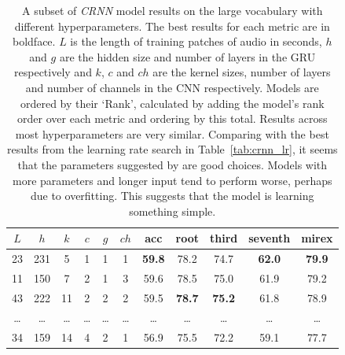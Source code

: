 \begin{table}[h]
    \centering
    \begin{tabular}{ccccccccccc}
        \toprule
        $L$ & $h$ & $k$ & $c$ & $g$ & $ch$ & acc & root & third & seventh & mirex \\
        \midrule
        23 & 231 & 5 & 1 & 1 & 1 & \textbf{59.8} & 78.2 & 74.7 & \textbf{62.0} & \textbf{79.9} \\
        11 & 150 & 7 & 2 & 1 & 3 & 59.6 & 78.5 & 75.0 & 61.9 & 79.2 \\
        43 & 222 & 11 & 2 & 2 & 2 & 59.5 & \textbf{78.7} & \textbf{75.2} & 61.8 & 78.9 \\
        \ldots & \ldots & \ldots & \ldots & \ldots & \ldots & \ldots & \ldots & \ldots & \ldots & \ldots \\
        34 & 159 & 14 & 4 & 2 & 1 & 56.9 & 75.5 & 72.2 & 59.1 & 77.7 \\
        \bottomrule
    \end{tabular}
    \caption{A subset of \emph{CRNN} model results on the large vocabulary with different hyperparameters. The best results for each metric are in boldface. $L$ is the length of training patches of audio in seconds, $h$ and $g$ are the hidden size and number of layers in the GRU respectively and $k$, $c$ and $ch$ are the kernel sizes, number of layers and number of channels in the CNN respectively. Models are ordered by their `Rank', calculated by adding the model's rank order over each metric and ordering by this total. Results across most hyperparameters are very similar. Comparing with the best results from the learning rate search in Table~\ref{tab:crnn_lr}, it seems that the parameters suggested by \citet{StructuredTraining} are good choices. Models with more parameters and longer input tend to perform worse, perhaps due to overfitting. This suggests that the model is learning something simple.}\label{tab:crnn_hparams}
\end{table}




